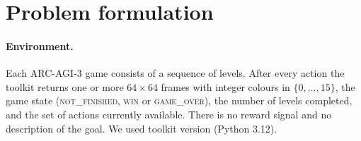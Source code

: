 \section{Problem formulation}\label{sec:problem}

\paragraph{Environment.} Each ARC-AGI-3 game consists of a sequence of
levels. After every action the toolkit returns one or more $64\times64$ frames
with integer colours in $\{0,\dots,15\}$, the game state
(\textsc{not\_finished}, \textsc{win} or \textsc{game\_over}), the number of
levels completed, and the set of actions currently available. There is no
reward signal and no description of the goal. We used toolkit version
 (Python 3.12). 

